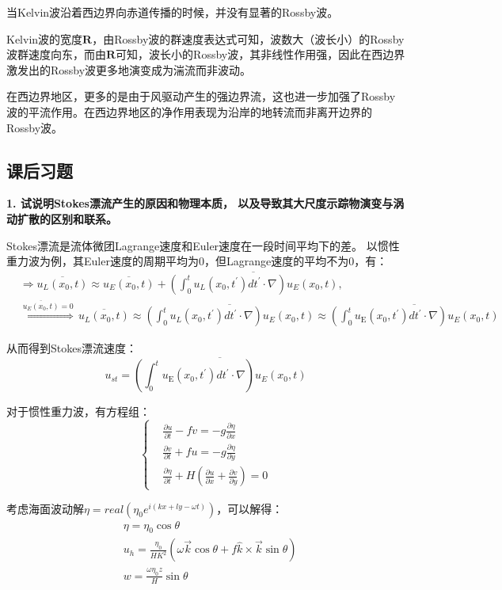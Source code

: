 \documentclass{article}
\begin{document}
当Kelvin波沿着西边界向赤道传播的时候，并没有显著的Rossby波。

Kelvin波的宽度$\mathbf{R}$，由Rossby波的群速度表达式可知，波数大（波长小）的Rossby波群速度向东，而由$\mathbf{R}$可知，波长小的Rossby波，其非线性作用强，因此在西边界激发出的Rossby波更多地演变成为湍流而非波动。

在西边界地区，更多的是由于风驱动产生的强边界流，这也进一步加强了Rossby波的平流作用。在西边界地区的净作用表现为沿岸的地转流而非离开边界的Rossby波。

\subsection{课后习题}
\textbf{1. 试说明Stokes漂流产生的原因和物理本质，
以及导致其大尺度示踪物演变与涡动扩散的区别和联系。}

Stokes漂流是流体微团Lagrange速度和Euler速度在一段时间平均下的差。
以惯性重力波为例，其Euler速度的周期平均为0，但Lagrange速度的平均不为0，有：
\begin{align}
   & \Rightarrow \overline{{{u}_{L}}({{x}_{0}},t)}
   \approx \overline{{{u}_{E}}({{x}_{0}},t)}
   +\overline{(\int_{0}^{t}{{{u}_{L}}({{x}_{0}},t^{\prime})}dt^{\prime}\cdot \nabla ){{u}_{E}}({{x}_{0}},t)}, \\ 
   & \overset{\overline{{{u}_{E}}({{x}_{0}},t)}=0}{\mathop{\Rightarrow }}\,\overline{{{u}_{L}}({{x}_{0}},t)}\approx
    \overline{(\int_{0}^{t}{{{u}_{L}}({{x}_{0}},t^{\prime})}dt^{\prime}\cdot \nabla ){{u}_{E}}({{x}_{0}},t)}\approx 
    \overline{(\int_{0}^{t}{{{u}_{\text{E}}}({{x}_{0}},t^{\prime})}dt^{\prime}\cdot \nabla ){{u}_{E}}({{x}_{0}},t)}
\end{align}

从而得到Stokes漂流速度：
$$u_{st}=\overline{(\int_{0}^{t}{{{u}_{\text{E}}}({{x}_{0}},t^{\prime})}dt^{\prime}\cdot \nabla ){{u}_{E}}({{x}_{0}},t)}$$

对于惯性重力波，有方程组：
$$\begin{cases}
    &\frac{\partial u}{\partial t}-fv=-g\frac{\partial \eta}{\partial x}\\
    &\frac{\partial v}{\partial t}+fu=-g\frac{\partial \eta}{\partial y}\\
    &\frac{\partial \eta}{\partial t}+H(\frac{\partial u}{\partial x}+\frac{\partial v}{\partial y} ) = 0
\end{cases}$$

考虑海面波动解$\eta = real(\eta_0e^{i(kx+ly-\omega t)})$，可以解得：
\begin{align}
    &\eta = \eta_0\cos\theta \\
    &u_h = \frac{\eta_0}{HK^2}(\omega\vec{k}\cos\theta + f\hat{k}\times\vec{k}\sin\theta)\\
    &w = \frac{\omega\eta_0z}{H}\sin\theta
\end{align}
\end{document}
